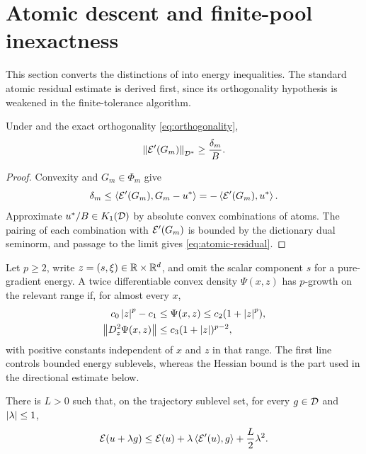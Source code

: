 \section{Atomic descent and finite-pool inexactness}
\label{sec:descent}

This section converts the distinctions of  into energy inequalities. The standard
atomic residual estimate is derived first, since its orthogonality hypothesis is weakened in the
finite-tolerance algorithm.

\begin{lemma}
\label{lem:atomic-residual}
Under  and the exact orthogonality \cref{eq:orthogonality},
\begin{equation}
  \left\lVert \mathcal{E}'(G_m)\right\rVert_{\mathcal{D}^*}\geq \frac{\delta_m}{B}.
\label{eq:atomic-residual}
\end{equation}
\end{lemma}

\begin{proof}
Convexity and \(G_m\in\Phi_m\) give
\[
 \delta_m\leq\left\langle \mathcal{E}'(G_m),G_m-u^*\right\rangle
 =-\left\langle \mathcal{E}'(G_m),u^*\right\rangle.
\]
Approximate \(u^*/B\in K_1(\mathcal{D})\) by absolute convex combinations of atoms. The pairing of each
combination with \(\mathcal{E}'(G_m)\) is bounded by the dictionary dual seminorm, and passage to the limit gives
\cref{eq:atomic-residual}.
\end{proof}

\begin{definition}
\label{def:p-growth}
Let \(p\geq2\), write \(z=(s,\xi)\in\mathbb{R}\times\mathbb{R}^d\), and omit the scalar component \(s\) for a
pure-gradient energy. A twice differentiable convex density \(\Psi(x,z)\) has \(p\)-growth on the
relevant range if, for almost every \(x\),
\begin{align*}
 c_0\left\lvert z\right\rvert^p-c_1&\leq \Psi(x,z)\leq c_2(1+\left\lvert z\right\rvert^p),\\
 \left\lVert D_z^2\Psi(x,z)\right\rVert&\leq c_3(1+\left\lvert z\right\rvert)^{p-2},
\end{align*}
with positive constants independent of \(x\) and \(z\) in that range. The first line controls bounded
energy sublevels, whereas the Hessian bound is the part used in the directional estimate below.
\end{definition}

\begin{assumption}
\label{ass:directional}
There is \(L>0\) such that, on the trajectory sublevel set, for every \(g\in\mathcal{D}\) and
\(\left\lvert \lambda\right\rvert\leq1\),
\begin{equation}
 \mathcal{E}(u+\lambda g)\leq\mathcal{E}(u)+\lambda\left\langle \mathcal{E}'(u),g\right\rangle+\frac L2\lambda^2.
\label{eq:directional-smoothness}
\end{equation}
\end{assumption}


